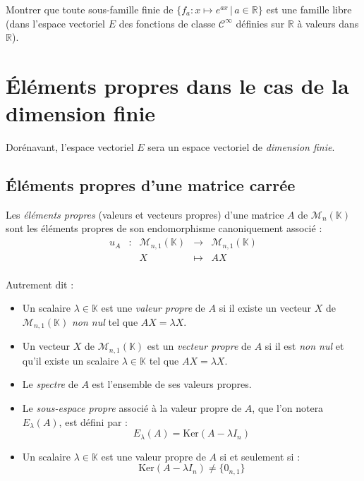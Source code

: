 \documentclass[french,11pt,twoside]{VcCours}
\begin{document}
\vspace{6cm}
\begin{ApplicationDirecte}{} Montrer que toute sous-famille finie de $\lbrace f_a : x \mapsto e^{ax} \, \vert \, a \in \mathbb{R}\rbrace$ est une famille libre (dans l'espace vectoriel $E$ des fonctions de classe $\mathcal{C}^{\infty}$ définies sur $\mathbb{R}$ à valeurs dans $\mathbb{R}$).
\end{ApplicationDirecte}

\section{Éléments propres dans le cas de la dimension finie}

Dorénavant, l'espace vectoriel $E$ sera un espace vectoriel de \emph{dimension finie}.

\subsection{Éléments propres d'une matrice carrée}

\begin{Definition}{} Les \emph{éléments propres} (valeurs et vecteurs propres) d'une matrice $A$ de $\mathcal{M}_n(\mathbb{K})$ sont les éléments propres de son endomorphisme canoniquement associé :
$$ \begin{array}{ccccl}
u_A & : & \mathcal{M}_{n,1}(\mathbb{K}) & \rightarrow & \mathcal{M}_{n,1}(\mathbb{K}) \\
 & & X & \mapsto & AX \\
\end{array}$$
\end{Definition}

Autrement dit : 

\begin{itemize}
\item Un scalaire $\lambda \in \mathbb{K}$ est une \emph{valeur propre} de $A$ si il existe un vecteur $X$ de $\mathcal{M}_{n,1}(\mathbb{K})$ \emph{non nul} tel que $AX= \lambda X$.
\item Un vecteur $X$ de $\mathcal{M}_{n,1}(\mathbb{K})$ est un \emph{vecteur propre} de $A$ si il est \emph{non nul} et qu'il existe un scalaire $\lambda \in \mathbb{K}$ tel que $AX=\lambda
X$.
\item Le \emph{spectre} de $A$ est l'ensemble de ses valeurs propres.
\item Le \emph{sous-espace propre} associé à la valeur propre de $A$, que l'on notera $E_{\lambda}(A)$, est défini par :
$$ E_{\lambda}(A) = \textrm{Ker}(A- \lambda I_n) $$
\item Un scalaire $\lambda \in \mathbb{K}$ est une valeur propre de $A$ si et seulement si :
$$ \textrm{Ker}(A- \lambda I_n) \neq \lbrace 0_{n,1} \rbrace$$
\end{itemize}
\end{document}
